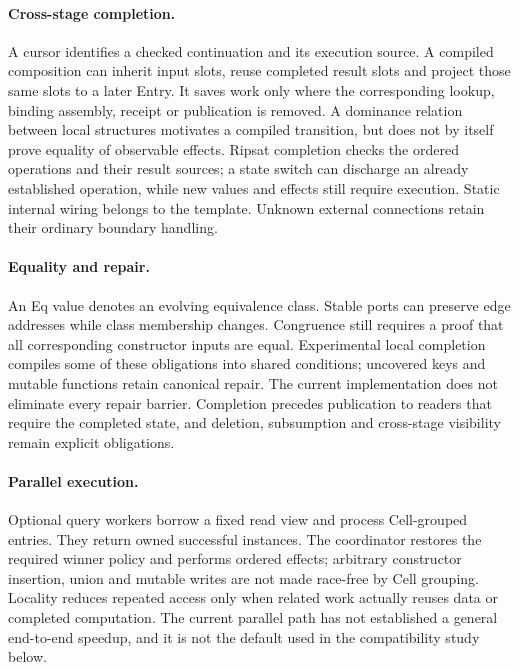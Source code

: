 \paragraph{Cross-stage completion.}
A cursor identifies a checked continuation and its execution source. A compiled
composition can inherit input slots, reuse completed result slots and project
those same slots to a later Entry. It saves work only where the corresponding
lookup, binding assembly, receipt or publication is removed. A dominance
relation between local structures motivates a compiled transition, but does not
by itself prove equality of observable effects. Ripsat completion checks the
ordered operations and their result sources; a state switch can discharge an
already established operation, while new values and effects still require
execution. Static internal wiring belongs to the template. Unknown external
connections retain their ordinary boundary handling.

\paragraph{Equality and repair.}
An Eq value denotes an evolving equivalence class. Stable ports can preserve
edge addresses while class membership changes. Congruence still requires a
proof that all corresponding constructor inputs are equal. Experimental local
completion compiles some of these obligations into shared conditions; uncovered
keys and mutable functions retain canonical repair. The current implementation
does not eliminate every repair barrier. Completion precedes publication to
readers that require the completed state, and deletion, subsumption and
cross-stage visibility remain explicit obligations.

\paragraph{Parallel execution.}
Optional query workers borrow a fixed read view and process Cell-grouped entries.
They return owned successful instances. The coordinator restores the required
winner policy and performs ordered effects; arbitrary constructor insertion,
union and mutable writes are not made race-free by Cell grouping. Locality
reduces repeated access only when related work actually reuses data or completed
computation. The current parallel path has not established a general end-to-end
speedup, and it is not the default used in the compatibility study below.

